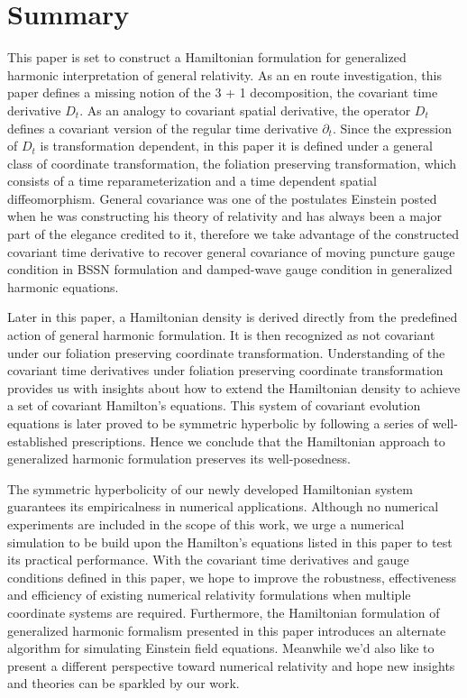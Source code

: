 \chapter{Summary}
This paper is set to construct a Hamiltonian formulation for generalized harmonic interpretation of general relativity. As an en route investigation, this paper defines a missing notion of the 3 + 1 decomposition, the covariant time derivative $D_{t}$. As an analogy to covariant spatial derivative, the operator $D_{t}$ defines a covariant version of the regular time derivative $\partial_{t}$. Since the expression of $D_{t}$ is transformation dependent, in this paper it is defined under a general class of coordinate transformation, the foliation preserving transformation, which consists of a time reparameterization and a time dependent spatial diffeomorphism. General covariance was one of the postulates Einstein posted when he was constructing his theory of relativity and has always been a major part of the elegance credited to it, therefore we take advantage of the constructed covariant time derivative to recover general covariance of moving puncture gauge condition in BSSN formulation and damped-wave gauge condition in generalized harmonic equations. 

Later in this paper, a Hamiltonian density is derived directly from the predefined action of general harmonic formulation. It is then recognized as not covariant under our foliation preserving coordinate transformation. Understanding of the covariant time derivatives under foliation preserving coordinate transformation provides us with insights about how to extend the Hamiltonian density to achieve a set of covariant Hamilton's equations. This system of covariant evolution equations is later proved to be symmetric hyperbolic by following a series of well-established prescriptions. Hence we conclude that the Hamiltonian approach to generalized harmonic formulation preserves its well-posedness. 

The symmetric hyperbolicity of our newly developed Hamiltonian system guarantees its empiricalness in numerical applications. Although no numerical experiments are included in the scope of this work, we urge a numerical simulation to be build upon the Hamilton's equations listed in this paper to test its practical performance. With the covariant time derivatives and gauge conditions defined in this paper, we hope to improve the robustness, effectiveness and efficiency of existing numerical relativity formulations when multiple coordinate systems are required. Furthermore, the Hamiltonian formulation of generalized harmonic formalism presented in this paper introduces an alternate algorithm for simulating Einstein field equations. Meanwhile we'd also like to present a different perspective toward numerical relativity and hope new insights and theories can be sparkled by our work. 